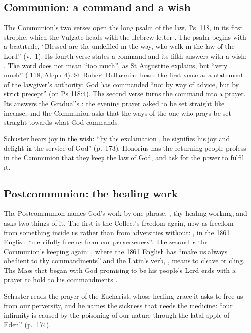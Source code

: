 \subsection{Communion: a command and a wish}

The Communion's two verses open the long psalm of the law, Ps~118, in its first
strophe, which the Vulgate heads with the Hebrew letter . The
psalm begins with a beatitude, ``Blessed are the undefiled in the way, who walk
in the law of the Lord'' (v.~1). Its fourth verse states a command and its
fifth answers with a wish: . The word
 does not mean ``too much'', as St Augustine explains, but ``very
much'' ( 118, Aleph 4). St Robert Bellarmine hears the
first verse as a statement of the lawgiver's authority: God has commanded
``not by way of advice, but by strict precept'' (on Ps 118:4). The
second verse turns the command into a prayer. Its  answers
the Gradual's : the evening prayer asked to be set straight
like incense, and the Communion asks that the ways of the one who prays be set
straight towards what God commands.

Schuster hears joy in the wish: ``by the exclamation , he
signifies his joy and delight in the service of God'' (p.~173). Honorius has
the returning people profess in the Communion that they keep the law of God,
and ask for the power to fulfil it.

\subsection{Postcommunion: the healing work}

The Postcommunion names God's work by one phrase,
, thy healing working, and asks two
things of it. The first is the Collect's freedom again, now as freedom from
something inside us rather than from adversities without: , in the 1861 English ``mercifully free us
from our perverseness''. The second is the Communion's keeping again:
, where the 1861 English has
``make us always obedient to thy commandments'' and the Latin's verb,
, means to cleave or cling.
The Mass that began with God promising to be his people's Lord  ends with a prayer to hold to his commandments .

Schuster reads the prayer of the Eucharist, whose healing grace it asks to
free us from our perversity, and he names the sickness that needs the
medicine: ``our infirmity is caused by the poisoning of our nature through the
fatal apple of Eden'' (p.~174).
